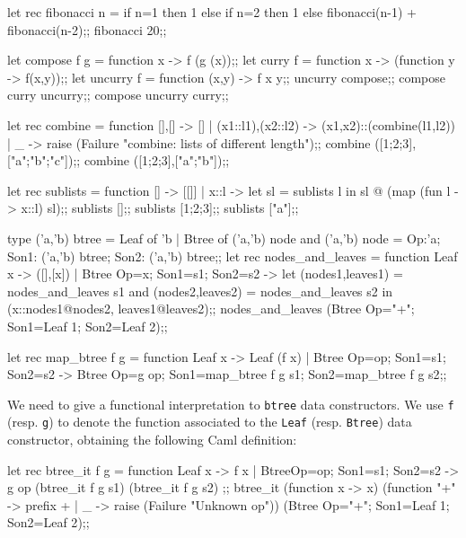 \begin{caml_example}
let rec fibonacci n =
  if n=1 then 1
         else if n=2 then 1
                     else fibonacci(n-1) + fibonacci(n-2);;
fibonacci 20;;
\end{caml_example}

\begin{caml_example}
let compose f g = function x -> f (g (x));;
let curry f = function x -> (function y -> f(x,y));;
let uncurry f = function (x,y) -> f x y;;
uncurry compose;;
compose curry uncurry;;
compose uncurry curry;;
\end{caml_example}

\begin{caml_example}
let rec combine =
  function [],[] -> []
         | (x1::l1),(x2::l2) -> (x1,x2)::(combine(l1,l2))
         | _ -> raise (Failure "combine: lists of different length");;
combine ([1;2;3],["a";"b";"c"]);;
combine ([1;2;3],["a";"b"]);;
\end{caml_example}

\begin{caml_example}
let rec sublists =
    function [] -> [[]]
           | x::l -> let sl = sublists l
                     in sl @ (map (fun l -> x::l) sl);;
sublists [];;
sublists [1;2;3];;
sublists ["a"];;
\end{caml_example}

\begin{caml_example}
type ('a,'b) btree = Leaf of 'b
                   | Btree of ('a,'b) node
and ('a,'b) node = {Op:'a;
                    Son1: ('a,'b) btree;
                    Son2: ('a,'b) btree};;
let rec nodes_and_leaves =
    function Leaf x -> ([],[x])
           | Btree {Op=x; Son1=s1; Son2=s2} ->
                let (nodes1,leaves1) = nodes_and_leaves s1
                and (nodes2,leaves2) = nodes_and_leaves s2
                in (x::nodes1@nodes2, leaves1@leaves2);;
nodes_and_leaves (Btree {Op="+"; Son1=Leaf 1; Son2=Leaf 2});;
\end{caml_example}

\begin{caml_example}
let rec map_btree f g = function
      Leaf x -> Leaf (f x)
    | Btree {Op=op; Son1=s1; Son2=s2}
               -> Btree {Op=g op; Son1=map_btree f g s1;
                                  Son2=map_btree f g s2};;
\end{caml_example}

We need to give a functional interpretation to {\tt btree} data constructors.
We use {\tt f} (resp. {\tt g}) to denote the function associated to
the {\tt Leaf} (resp. {\tt Btree}) data constructor, obtaining the
following Caml definition:
\begin{caml_example}
let rec btree_it f g = function
      Leaf x -> f x
    | Btree{Op=op; Son1=s1; Son2=s2}
              -> g op (btree_it f g s1) (btree_it f g s2)
;;
btree_it (function x -> x)
         (function "+" -> prefix +
                 | _ -> raise (Failure "Unknown op"))
         (Btree {Op="+"; Son1=Leaf 1; Son2=Leaf 2});;
\end{caml_example}

